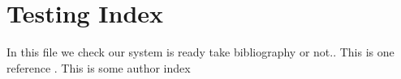 \documentclass{article}
\begin{document}
	\section{Testing Index}
	In this file we check our system is ready take bibliography or not..
This is one reference  . This is some author index 

\printindex
\printindex[a]
\end{document}
